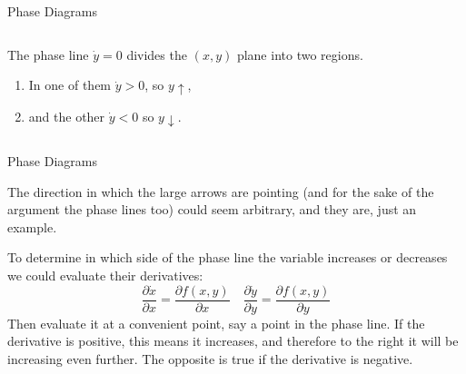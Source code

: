 \documentclass[aspectratio=169]{beamer}
\begin{document}
\begin{frame}{Phase Diagrams}
    \begin{columns}
        \begin{column}{0.47\textwidth}
            The phase line $\dot{y}=0$ divides the $(x,y)$ plane into two regions.
            \begin{enumerate}
                \item In one of them $\dot{y}>0$, so $y\uparrow$,
                \item and the other $\dot{y}<0$ so $y\downarrow$.
            \end{enumerate}
        \end{column}

        \begin{column}{0.47\textwidth}
            \begin{center}
            \end{center}
        \end{column}
    \end{columns}
\end{frame}

\begin{frame}{Phase Diagrams}
    
    The direction in which the large arrows are pointing (and for the sake of the argument the phase lines too) could seem arbitrary, and they are, just an example.\pause
    
    To determine in which side of the phase line the variable increases or decreases we could evaluate their derivatives:
    \[\frac{\partial\dot{x}}{\partial x}=\frac{\partial f(x,y)}{\partial x}\quad \frac{\partial\dot{y}}{\partial y}=\frac{\partial f(x,y)}{\partial y}\]
    Then evaluate it at a convenient point, say a point in the phase line. If the derivative is positive, this means it increases, and therefore to the right it will be increasing even further. The opposite is true if the derivative is negative.
\end{frame}
\end{document}
